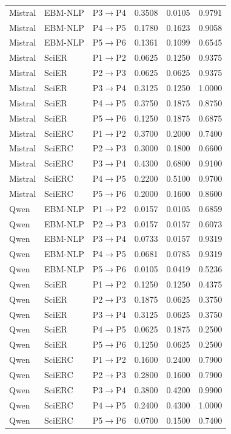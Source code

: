 \documentclass[fleqn,10pt]{wlscirep-authoryear}
\begin{document}
\begin{longtable}{lllrrr}
Mistral & EBM-NLP & P3$\rightarrow$P4 & 0.3508 & 0.0105 & 0.9791 \\
Mistral & EBM-NLP & P4$\rightarrow$P5 & 0.1780 & 0.1623 & 0.9058 \\
Mistral & EBM-NLP & P5$\rightarrow$P6 & 0.1361 & 0.1099 & 0.6545 \\
\addlinespace[2pt]
Mistral & SciER & P1$\rightarrow$P2 & 0.0625 & 0.1250 & 0.9375 \\
Mistral & SciER & P2$\rightarrow$P3 & 0.0625 & 0.0625 & 0.9375 \\
Mistral & SciER & P3$\rightarrow$P4 & 0.3125 & 0.1250 & 1.0000 \\
Mistral & SciER & P4$\rightarrow$P5 & 0.3750 & 0.1875 & 0.8750 \\
Mistral & SciER & P5$\rightarrow$P6 & 0.1250 & 0.1875 & 0.6875 \\
\addlinespace[2pt]
Mistral & SciERC & P1$\rightarrow$P2 & 0.3700 & 0.2000 & 0.7400 \\
Mistral & SciERC & P2$\rightarrow$P3 & 0.3000 & 0.1800 & 0.6600 \\
Mistral & SciERC & P3$\rightarrow$P4 & 0.4300 & 0.6800 & 0.9100 \\
Mistral & SciERC & P4$\rightarrow$P5 & 0.2200 & 0.5100 & 0.9700 \\
Mistral & SciERC & P5$\rightarrow$P6 & 0.2000 & 0.1600 & 0.8600 \\
\addlinespace[2pt]
Qwen & EBM-NLP & P1$\rightarrow$P2 & 0.0157 & 0.0105 & 0.6859 \\
Qwen & EBM-NLP & P2$\rightarrow$P3 & 0.0157 & 0.0157 & 0.6073 \\
Qwen & EBM-NLP & P3$\rightarrow$P4 & 0.0733 & 0.0157 & 0.9319 \\
Qwen & EBM-NLP & P4$\rightarrow$P5 & 0.0681 & 0.0785 & 0.9319 \\
Qwen & EBM-NLP & P5$\rightarrow$P6 & 0.0105 & 0.0419 & 0.5236 \\
\addlinespace[2pt]
Qwen & SciER & P1$\rightarrow$P2 & 0.1250 & 0.1250 & 0.4375 \\
Qwen & SciER & P2$\rightarrow$P3 & 0.1875 & 0.0625 & 0.3750 \\
Qwen & SciER & P3$\rightarrow$P4 & 0.3125 & 0.0625 & 0.3750 \\
Qwen & SciER & P4$\rightarrow$P5 & 0.0625 & 0.1875 & 0.2500 \\
Qwen & SciER & P5$\rightarrow$P6 & 0.1250 & 0.0625 & 0.2500 \\
\addlinespace[2pt]
Qwen & SciERC & P1$\rightarrow$P2 & 0.1600 & 0.2400 & 0.7900 \\
Qwen & SciERC & P2$\rightarrow$P3 & 0.2800 & 0.1600 & 0.7900 \\
Qwen & SciERC & P3$\rightarrow$P4 & 0.3800 & 0.4200 & 0.9900 \\
Qwen & SciERC & P4$\rightarrow$P5 & 0.2400 & 0.4300 & 1.0000 \\
Qwen & SciERC & P5$\rightarrow$P6 & 0.0700 & 0.1500 & 0.7400 \\
\end{longtable}
\endgroup
\end{document}
